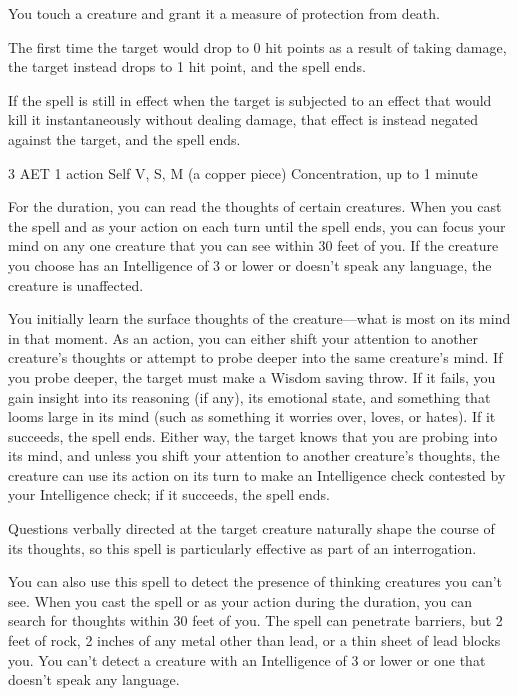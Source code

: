 You touch a creature and grant it a measure of protection from death.

The first time the target would drop to 0 hit points as a result of taking damage, the target instead drops to 1 hit point, and the spell ends.

If the spell is still in effect when the target is subjected to an effect that would kill it instantaneously without dealing damage, that effect is instead negated against the target, and the spell ends.


{3 AET}
{1 action}
{Self}
{V, S, M (a copper piece)}
{Concentration, up to 1 minute}

For the duration, you can read the thoughts of certain creatures. When you cast the spell and as your action on each turn until the spell ends, you can focus your mind on any one creature that you can see within 30 feet of you. If the creature you choose has an Intelligence of 3 or lower or doesn't speak any language, the creature is unaffected.

You initially learn the surface thoughts of the creature—what is most on its mind in that moment. As an action, you can either shift your attention to another creature's thoughts or attempt to probe deeper into the same creature's mind. If you probe deeper, the target must make a Wisdom saving throw. If it fails, you gain insight into its reasoning (if any), its emotional state, and something that looms large in its mind (such as something it worries over, loves, or hates). If it succeeds, the spell ends. Either way, the target knows that you are probing into its mind, and unless you shift your attention to another creature's thoughts, the creature can use its action on its turn to make an Intelligence check contested by your Intelligence check; if it succeeds, the spell ends.

Questions verbally directed at the target creature naturally shape the course of its thoughts, so this spell is particularly effective as part of an interrogation.

You can also use this spell to detect the presence of thinking creatures you can't see. When you cast the spell or as your action during the duration, you can search for thoughts within 30 feet of you. The spell can penetrate barriers, but 2 feet of rock, 2 inches of any metal other than lead, or a thin sheet of lead blocks you. You can't detect a creature with an Intelligence of 3 or lower or one that doesn't speak any language.


